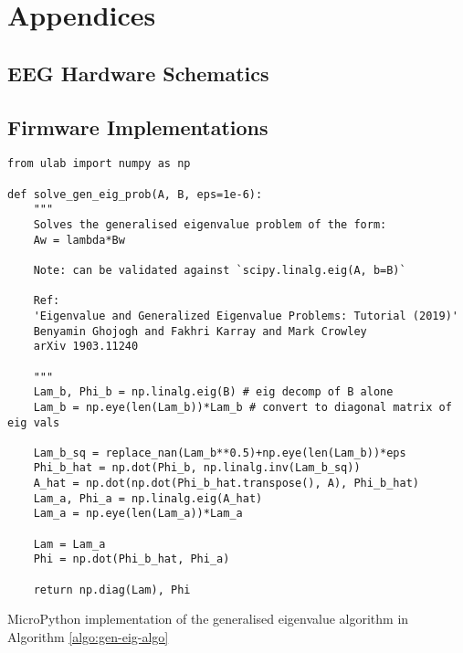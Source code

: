 \chapter{Appendices}
\label{chapter:appendices}

\graphicspath{ {report/Appendices/assets/} } 


\section{EEG Hardware Schematics}

\label{appendix:schematics}


\section{Firmware Implementations}
\label{app:firmware}

\begin{listing}[h]
\small
\begin{verbatim}
from ulab import numpy as np

def solve_gen_eig_prob(A, B, eps=1e-6):
    """
    Solves the generalised eigenvalue problem of the form:
    Aw = lambda*Bw
    
    Note: can be validated against `scipy.linalg.eig(A, b=B)`
    
    Ref: 
    'Eigenvalue and Generalized Eigenvalue Problems: Tutorial (2019)'
    Benyamin Ghojogh and Fakhri Karray and Mark Crowley
    arXiv 1903.11240

    """
    Lam_b, Phi_b = np.linalg.eig(B) # eig decomp of B alone
    Lam_b = np.eye(len(Lam_b))*Lam_b # convert to diagonal matrix of eig vals
    
    Lam_b_sq = replace_nan(Lam_b**0.5)+np.eye(len(Lam_b))*eps
    Phi_b_hat = np.dot(Phi_b, np.linalg.inv(Lam_b_sq))
    A_hat = np.dot(np.dot(Phi_b_hat.transpose(), A), Phi_b_hat)
    Lam_a, Phi_a = np.linalg.eig(A_hat)
    Lam_a = np.eye(len(Lam_a))*Lam_a
    
    Lam = Lam_a
    Phi = np.dot(Phi_b_hat, Phi_a)
    
    return np.diag(Lam), Phi

\end{verbatim}
\caption{MicroPython implementation of the generalised eigenvalue algorithm in Algorithm \ref{algo:gen-eig-algo}}
\label{app-listing:gen-eig-prob-mpy}
\end{listing}
